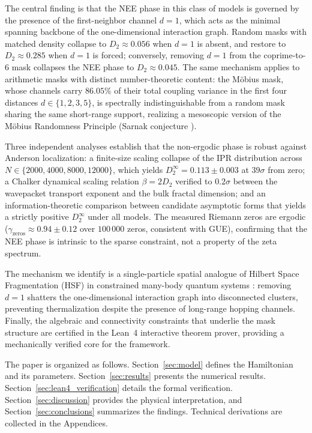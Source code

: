 \documentclass[11pt,a4paper]{article}
\begin{document}
The central finding is that the NEE phase in this class of models is
governed by the presence of the first-neighbor channel $d = 1$, which acts
as the minimal spanning backbone of the one-dimensional interaction graph.
Random masks with matched density collapse to $D_2 \approx 0.056$ when
$d=1$ is absent, and restore to $D_2 \approx 0.285$ when $d=1$ is forced;
conversely, removing $d=1$ from the coprime-to-6 mask collapses the NEE
phase to $D_2 \approx 0.045$. The same mechanism applies to arithmetic
masks with distinct number-theoretic content: the Möbius mask, whose
channels carry $86.05\%$ of their total coupling variance in the first
four distances $d \in \{1, 2, 3, 5\}$, is spectrally indistinguishable
from a random mask sharing the same short-range support, realizing a
mesoscopic version of the Möbius Randomness Principle (Sarnak conjecture
\cite{Sarnak2001,Rudnick2015}).

Three independent analyses establish that the non-ergodic phase is robust
against Anderson localization: a finite-size scaling collapse of the IPR
distribution across $N \in \{2000, 4000, 8000, 12000\}$, which yields
$D_2^\infty = 0.113 \pm 0.003$ at $39\sigma$ from zero; a Chalker dynamical
scaling relation $\beta = 2D_2$ verified to $0.2\sigma$ between the
wavepacket transport exponent and the bulk fractal dimension; and an
information-theoretic comparison between candidate asymptotic forms that
yields a strictly positive $D_2^\infty$ under all models. The measured
Riemann zeros are ergodic ($\gamma_{\text{zeros}} \approx 0.94 \pm 0.12$
over $100\,000$ zeros, consistent with GUE), confirming that the NEE phase
is intrinsic to the sparse constraint, not a property of the zeta spectrum.

The mechanism we identify is a single-particle spatial analogue of
Hilbert Space Fragmentation (HSF) in constrained many-body quantum
systems \cite{Sala2020_PRX,Rakovszky2020_PRB}: removing $d=1$ shatters
the one-dimensional interaction graph into disconnected clusters,
preventing thermalization despite the presence of long-range hopping
channels. Finally, the algebraic and connectivity constraints that
underlie the mask structure are certified in the Lean~4 interactive
theorem prover, providing a mechanically verified core for the framework.

The paper is organized as follows. Section~\ref{sec:model} defines the
Hamiltonian and its parameters. Section~\ref{sec:results} presents the
numerical results. Section~\ref{sec:lean4_verification} details the
formal verification. Section~\ref{sec:discussion} provides the physical
interpretation, and Section~\ref{sec:conclusions} summarizes the findings.
Technical derivations are collected in the Appendices.
\end{document}
